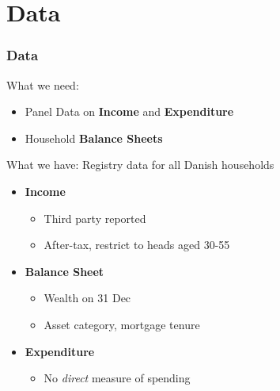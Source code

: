 \documentclass{beamer}
\begin{document}
\section{Data}
\frame
{
	\frametitle{Data}
	What we need:
	\begin{itemize}
		\item Panel Data on \textbf{Income} and \textbf{Expenditure}
		\item Household \textbf{Balance Sheets} 
	\end{itemize}
	\bigskip
	\pause
	What we have: Registry data for all Danish households
	\begin{itemize}
		\item \textbf{Income}
		\begin{itemize}
			\item[] Third party reported
			\item[] After-tax, restrict to heads aged 30-55
		\end{itemize}
		\item \textbf{Balance Sheet}
		\begin{itemize}
			\item[] Wealth on 31 Dec
			\item[] Asset category, mortgage tenure
		\end{itemize}
	\item \textbf{Expenditure}
		\begin{itemize}
		\item[] No \textit{direct} measure of spending
		\end{itemize}
	\end{itemize}
}
\frame[t]
\end{document}
